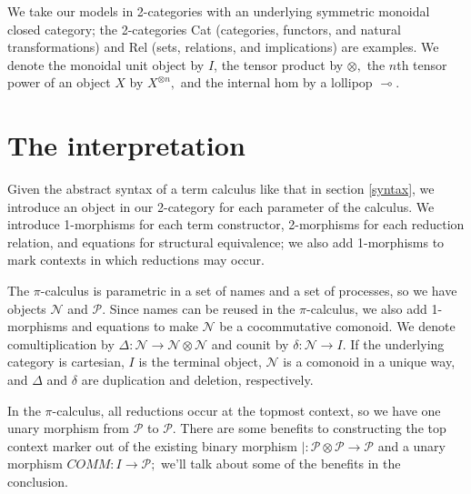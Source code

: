 \documentclass[]{acm_proc_article-sp}
\newcommand{\maps}{\colon}
\numberwithin{equation}{subsection}
\newcommand{\pic}{$\pi$-calculus}
\begin{document}
We take our models in 2-categories with an underlying symmetric
monoidal closed category; the 2-categories Cat (categories, functors,
and natural transformations) and Rel (sets, relations, and
implications) are examples.  We denote the monoidal unit object by
$I$, the tensor product by $\otimes,$ the $n$th tensor power of an
object $X$ by $X^{\otimes n},$ and the internal hom by a lollipop
$\multimap$.

\section{The interpretation}

Given the abstract syntax of a term calculus like that in section
\ref{syntax}, we introduce an object in our 2-category for each
parameter of the calculus.  We introduce 1-morphisms for each term
constructor, 2-morphisms for each reduction relation, and equations
for structural equivalence; we also add 1-morphisms to mark contexts
in which reductions may occur.

The {\pic} is parametric in a set of names and a set of processes, so
we have objects $\mathcal{N}$ and $\mathcal{P}$.  Since names can be reused in the {\pic,}
we also add 1-morphisms and equations to make $\mathcal{N}$ be a cocommutative
comonoid.  We denote comultiplication by $\Delta\maps \mathcal{N} \to \mathcal{N} \otimes
\mathcal{N}$ and counit by $\delta\maps \mathcal{N} \to I.$ If the underlying category is
cartesian, $I$ is the terminal object, $\mathcal{N}$ is a comonoid in a unique
way, and $\Delta$ and $\delta$ are duplication and deletion,
respectively.

In the {\pic,} all reductions occur at the topmost context, so we have
one unary morphism from $\mathcal{P}$ to $\mathcal{P}$.  There are some benefits to
constructing the top context marker out of the existing binary
morphism $|\maps \mathcal{P} \otimes \mathcal{P} \to \mathcal{P}$ and a unary morphism $COMM\maps I
\to \mathcal{P};$ we'll talk about some of the benefits in the conclusion.
\end{document}
